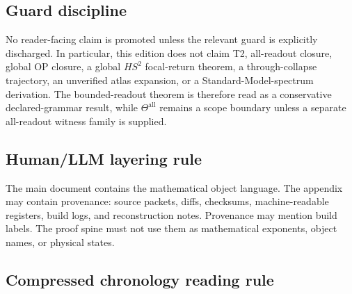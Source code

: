 \subsection*{Guard discipline}

No reader-facing claim is promoted unless the relevant guard is explicitly discharged.  In particular, this edition does not claim T2, all-readout closure, global OP closure, a global \(HS^2\) focal-return theorem, a through-collapse trajectory, an unverified atlas expansion, or a Standard-Model-spectrum derivation.  The bounded-readout theorem is therefore read as a conservative declared-grammar result, while \(\Theta^{\mathrm{all}}\) remains a scope boundary unless a separate all-readout witness family is supplied.

\subsection*{Human/LLM layering rule}

The main document contains the mathematical object language.  The appendix may contain provenance: source packets, diffs, checksums, machine-readable registers, build logs, and reconstruction notes.  Provenance may mention build labels.  The proof spine must not use them as mathematical exponents, object names, or physical states.


\subsection*{Compressed chronology reading rule}

